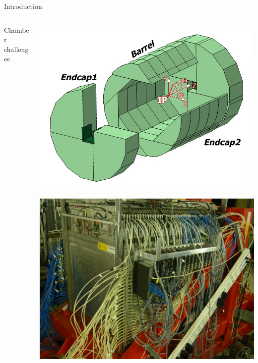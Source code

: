 \documentclass[10pt]{beamer}
\begin{document}
\begin{frame}[shrink=5]{Introduction}
\begin{columns}
\begin{column}{0.6\textwidth}
\begin{block}{\small  Chamber challenges}
{        }
      \end{block}

    \end{column}

    \begin{column}{0.4\textwidth}
      \centerline{\includegraphics[height=0.45\textheight]{jpg/IldDhcal}}
      \centerline{\includegraphics[height=0.25\textheight]{jpg/m3Proto.jpg}}

\end{column}
\end{columns}
\end{frame}
\end{document}
